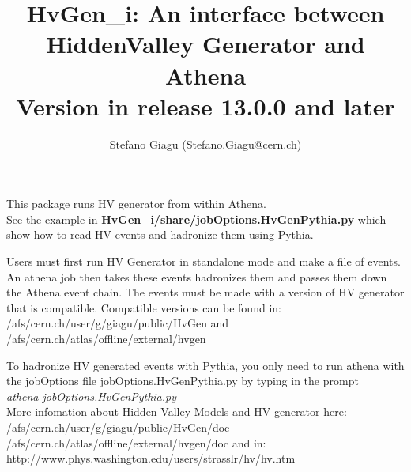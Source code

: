 \documentclass[11pt]{article}
\begin{document}
\title{HvGen\_i: An interface between HiddenValley Generator and Athena\\
Version in release 13.0.0 and later}
\author{ Stefano Giagu (Stefano.Giagu@cern.ch) }

\maketitle           

This package runs HV generator from within Athena. \\See the example
in {\bf HvGen\_i/share/jobOptions.HvGenPythia.py } which show how to
read HV events and hadronize them using Pythia.

Users must first run HV Generator in standalone mode and make a file of events. An athena job
then takes these events hadronizes them and passes them down the
Athena event chain. The events must be made with a version of HV generator
that is compatible.
Compatible versions can be found in:
/afs/cern.ch/user/g/giagu/public/HvGen and /afs/cern.ch/atlas/offline/external/hvgen

To hadronize HV generated events with Pythia, you only need to run athena with the jobOptions
file jobOptions.HvGenPythia.py by typing in the prompt \\
{\it athena jobOptions.HvGenPythia.py}\\

More infomation about Hidden Valley Models and HV generator here: \\
/afs/cern.ch/user/g/giagu/public/HvGen/doc \\
/afs/cern.ch/atlas/offline/external/hvgen/doc and in: \\
http://www.phys.washington.edu/users/strasslr/hv/hv.htm
\end{document}
